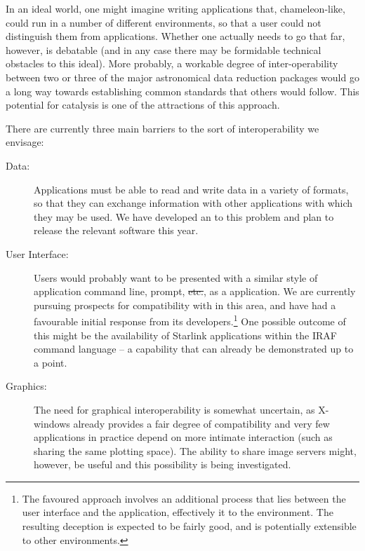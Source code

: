 In an ideal world, one might imagine writing applications that,
chameleon-like, could run in a number of different environments, so
that a user could not distinguish them from  applications.
Whether one actually needs to go that far, however, is debatable (and
in any case there may be formidable technical obstacles to this
ideal).  More probably, a workable degree of inter-operability between
two or three of the major astronomical data reduction packages would
go a long way towards establishing common standards that others would
follow. This potential for catalysis is one of the attractions of this
approach.

There are currently three main barriers to the sort of
interoperability we envisage:

\begin{description}
\item[Data:] Applications must be able to read and write data in a
variety of formats, so that they can exchange information with other
applications with which they may be used. We have developed an
 to this problem and plan to release the
relevant software this year.

\item[User Interface:] Users would probably want to be presented with
a similar style of application command line, prompt, \st{etc.}, as a
 application.  We are currently pursuing prospects for
compatibility with  in this area, and have had a
favourable initial response from its developers.\footnote{The favoured
approach involves an additional process that lies between the user
interface and the application, effectively  it to the
environment. The resulting deception is expected to be fairly good,
and is potentially extensible to other environments.} One possible
outcome of this might be the availability of Starlink applications
within the IRAF command language -- a capability that can already be
demonstrated up to a point.

\item[Graphics:] The need for graphical interoperability is somewhat
uncertain, as X-windows already provides a fair degree of
compatibility and very few applications in practice depend on more
intimate interaction (such as sharing the same plotting space). The
ability to share image servers might, however, be useful and this
possibility is being investigated.

\end{description}


